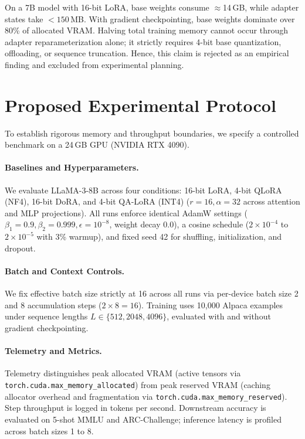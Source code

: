 \documentclass[11pt,a4paper]{article}
\begin{document}
On a 7B model with 16-bit LoRA, base weights consume $\approx$14\,GB, while adapter states take $<150$\,MB. With gradient checkpointing, base weights dominate over 80\% of allocated VRAM. Halving total training memory cannot occur through adapter reparameterization alone; it strictly requires 4-bit base quantization, offloading, or sequence truncation. Hence, this claim is rejected as an empirical finding and excluded from experimental planning.

\section{Proposed Experimental Protocol}

To establish rigorous memory and throughput boundaries, we specify a controlled benchmark on a 24\,GB GPU (NVIDIA RTX 4090).

\paragraph{Baselines and Hyperparameters.} We evaluate LLaMA-3-8B across four conditions: 16-bit LoRA, 4-bit QLoRA (NF4), 16-bit DoRA, and 4-bit QA-LoRA (INT4) ($r=16, \alpha=32$ across attention and MLP projections). All runs enforce identical AdamW settings ($\beta_1=0.9, \beta_2=0.999, \epsilon=10^{-8}$, weight decay 0.0), a cosine schedule ($2 \times 10^{-4}$ to $2 \times 10^{-5}$ with 3\% warmup), and fixed seed 42 for shuffling, initialization, and dropout.

\paragraph{Batch and Context Controls.} We fix effective batch size strictly at 16 across all runs via per-device batch size 2 and 8 accumulation steps ($2 \times 8 = 16$). Training uses 10,000 Alpaca examples under sequence lengths $L \in \{512, 2048, 4096\}$, evaluated with and without gradient checkpointing.

\paragraph{Telemetry and Metrics.} Telemetry distinguishes peak allocated VRAM (active tensors via \nolinkurl{torch.cuda.max_memory_allocated}) from peak reserved VRAM (caching allocator overhead and fragmentation via \nolinkurl{torch.cuda.max_memory_reserved}). Step throughput is logged in tokens per second. Downstream accuracy is evaluated on 5-shot MMLU and ARC-Challenge; inference latency is profiled across batch sizes 1 to 8.
\end{document}
